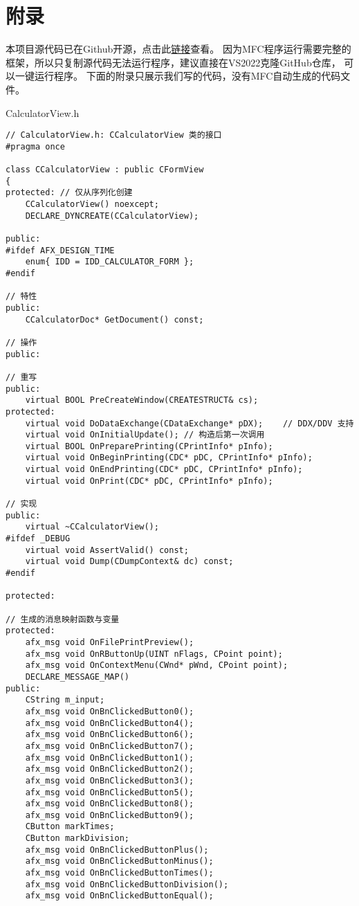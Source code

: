 \section{附录}
本项目源代码已在Github开源，点击此\href{https://github.com/BHZ-boom/Calculator}{链接}查看。
因为MFC程序运行需要完整的框架，所以只复制源代码无法运行程序，建议直接在VS2022克隆GitHub仓库，
可以一键运行程序。
下面的附录只展示我们写的代码，没有MFC自动生成的代码文件。

CalculatorView.h
\begin{lstlisting}
// CalculatorView.h: CCalculatorView 类的接口
#pragma once

class CCalculatorView : public CFormView
{
protected: // 仅从序列化创建
    CCalculatorView() noexcept;
    DECLARE_DYNCREATE(CCalculatorView);

public:
#ifdef AFX_DESIGN_TIME
    enum{ IDD = IDD_CALCULATOR_FORM };
#endif

// 特性
public:
    CCalculatorDoc* GetDocument() const;

// 操作
public:

// 重写
public:
    virtual BOOL PreCreateWindow(CREATESTRUCT& cs);
protected:
    virtual void DoDataExchange(CDataExchange* pDX);    // DDX/DDV 支持
    virtual void OnInitialUpdate(); // 构造后第一次调用
    virtual BOOL OnPreparePrinting(CPrintInfo* pInfo);
    virtual void OnBeginPrinting(CDC* pDC, CPrintInfo* pInfo);
    virtual void OnEndPrinting(CDC* pDC, CPrintInfo* pInfo);
    virtual void OnPrint(CDC* pDC, CPrintInfo* pInfo);

// 实现
public:
    virtual ~CCalculatorView();
#ifdef _DEBUG
    virtual void AssertValid() const;
    virtual void Dump(CDumpContext& dc) const;
#endif

protected:

// 生成的消息映射函数与变量
protected:
    afx_msg void OnFilePrintPreview();
    afx_msg void OnRButtonUp(UINT nFlags, CPoint point);
    afx_msg void OnContextMenu(CWnd* pWnd, CPoint point);
    DECLARE_MESSAGE_MAP()
public:
    CString m_input;
    afx_msg void OnBnClickedButton0();
    afx_msg void OnBnClickedButton4();
    afx_msg void OnBnClickedButton6();
    afx_msg void OnBnClickedButton7();
    afx_msg void OnBnClickedButton1();
    afx_msg void OnBnClickedButton2();
    afx_msg void OnBnClickedButton3();
    afx_msg void OnBnClickedButton5();
    afx_msg void OnBnClickedButton8();
    afx_msg void OnBnClickedButton9();
    CButton markTimes;
    CButton markDivision;
    afx_msg void OnBnClickedButtonPlus();
    afx_msg void OnBnClickedButtonMinus();
    afx_msg void OnBnClickedButtonTimes();
    afx_msg void OnBnClickedButtonDivision();
    afx_msg void OnBnClickedButtonEqual();
    

\end{lstlisting}
